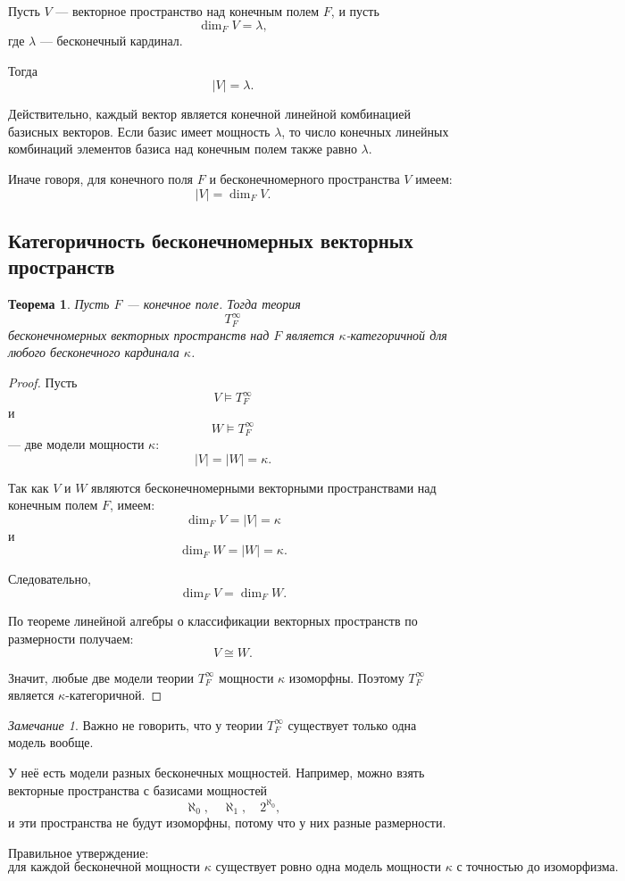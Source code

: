 \documentclass[12pt,a4paper,oneside,openany]{book}
\theoremstyle{definition}
\theoremstyle{plain}
\newtheorem{theorem}{Теорема}[chapter]
\theoremstyle{remark}
\newtheorem{remark}{Замечание}[chapter]
\begin{document}
Пусть $V$ — векторное пространство над конечным полем $F$, и пусть
\[
\dim_F V=\lambda,
\]
где $\lambda$ — бесконечный кардинал.

Тогда
\[
|V|=\lambda.
\]

Действительно, каждый вектор является конечной линейной комбинацией базисных векторов. Если базис имеет мощность $\lambda$, то число конечных линейных комбинаций элементов базиса над конечным полем также равно $\lambda$.

Иначе говоря, для конечного поля $F$ и бесконечномерного пространства $V$ имеем:
\[
|V|=\dim_F V.
\]

\subsection{Категоричность бесконечномерных векторных пространств}

\begin{theorem}
Пусть $F$ — конечное поле. Тогда теория
\[
T_F^\infty
\]
бесконечномерных векторных пространств над $F$ является $\kappa$-категоричной для любого бесконечного кардинала $\kappa$.
\end{theorem}

\begin{proof}
Пусть
\[
V\models T_F^\infty
\]
и
\[
W\models T_F^\infty
\]
— две модели мощности $\kappa$:
\[
|V|=|W|=\kappa.
\]

Так как $V$ и $W$ являются бесконечномерными векторными пространствами над конечным полем $F$, имеем:
\[
\dim_F V=|V|=\kappa
\]
и
\[
\dim_F W=|W|=\kappa.
\]

Следовательно,
\[
\dim_F V=\dim_F W.
\]

По теореме линейной алгебры о классификации векторных пространств по размерности получаем:
\[
V\cong W.
\]

Значит, любые две модели теории $T_F^\infty$ мощности $\kappa$ изоморфны. Поэтому $T_F^\infty$ является $\kappa$-категоричной.
\end{proof}

\begin{remark}
Важно не говорить, что у теории $T_F^\infty$ существует только одна модель вообще.

У неё есть модели разных бесконечных мощностей. Например, можно взять векторные пространства с базисами мощностей
\[
\aleph_0,\quad \aleph_1,\quad 2^{\aleph_0},
\]
и эти пространства не будут изоморфны, потому что у них разные размерности.

Правильное утверждение:
\[
\text{для каждой бесконечной мощности }\kappa
\text{ существует ровно одна модель мощности }\kappa
\text{ с точностью до изоморфизма.}
\]
\end{remark}
\end{document}
